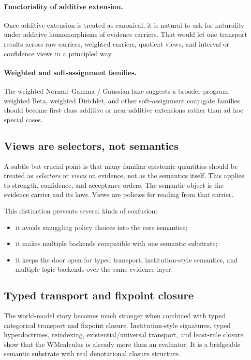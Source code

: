 \documentclass[11pt]{article}
\newcommand{\WM}{WM}
\begin{document}
\paragraph{Functoriality of additive extension.}
Once additive extension is treated as canonical, it is natural to ask for naturality under additive homomorphisms of evidence carriers. That would let one transport results across raw carriers, weighted carriers, quotient views, and interval or confidence views in a principled way.

\paragraph{Weighted and soft-assignment families.}
The weighted Normal--Gamma / Gaussian lane suggests a broader program: weighted Beta, weighted Dirichlet, and other soft-assignment conjugate families should become first-class additive or near-additive extensions rather than ad hoc special cases.

\subsection{Views are selectors, not semantics}

A subtle but crucial point is that many familiar epistemic quantities should be treated as \emph{selectors} or \emph{views} on evidence, not as the semantics itself. This applies to strength, confidence, and acceptance orders. The semantic object is the evidence carrier and its laws. Views are policies for reading from that carrier.

This distinction prevents several kinds of confusion:

\begin{itemize}
  \item it avoids smuggling policy choices into the core semantics;
  \item it makes multiple backends compatible with one semantic substrate;
  \item it keeps the door open for typed transport, institution-style semantics, and multiple logic backends over the same evidence layer.
\end{itemize}

\subsection{Typed transport and fixpoint closure}

The world-model story becomes much stronger when combined with typed categorical transport and fixpoint closure. Institution-style signatures, typed hyperdoctrines, reindexing, existential/universal transport, and least-rule closure show that the \WM calculus is already more than an evaluator. It is a bridgeable semantic substrate with real denotational closure structure.
\end{document}
